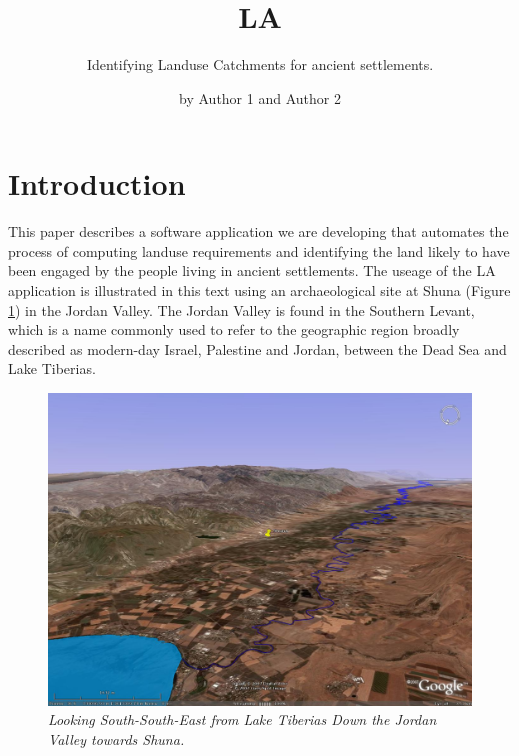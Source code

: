 

\title{LA} \subtitle{Identifying Landuse Catchments for 
ancient settlements.}
\author{by Author 1 and Author 2}
\maketitle
\section{Introduction} \label{sec:Introduction}
  This paper describes a software application we are developing that automates
  the process of computing landuse requirements and identifying the land likely 
  to have been engaged by the people living in ancient settlements.
  The useage of the LA application is illustrated in this text using an
  archaeological site at Shuna (Figure \ref{fig:shunaGoogleEarth}) in the
  Jordan Valley.  The Jordan Valley is found in the Southern Levant, which is a name
  commonly used to refer to the geographic region broadly described as
  modern-day Israel, Palestine and Jordan, between the Dead Sea and Lake Tiberias.
\begin{figure}[htbp] %
  \includegraphics[scale=0.17]{./images/ShunaGoogleEarth3D.jpg}
  \caption{\label{fig:shunaGoogleEarth}\textit{Looking South-South-East from Lake
    Tiberias Down the Jordan Valley towards Shuna.}} 
\end{figure}
